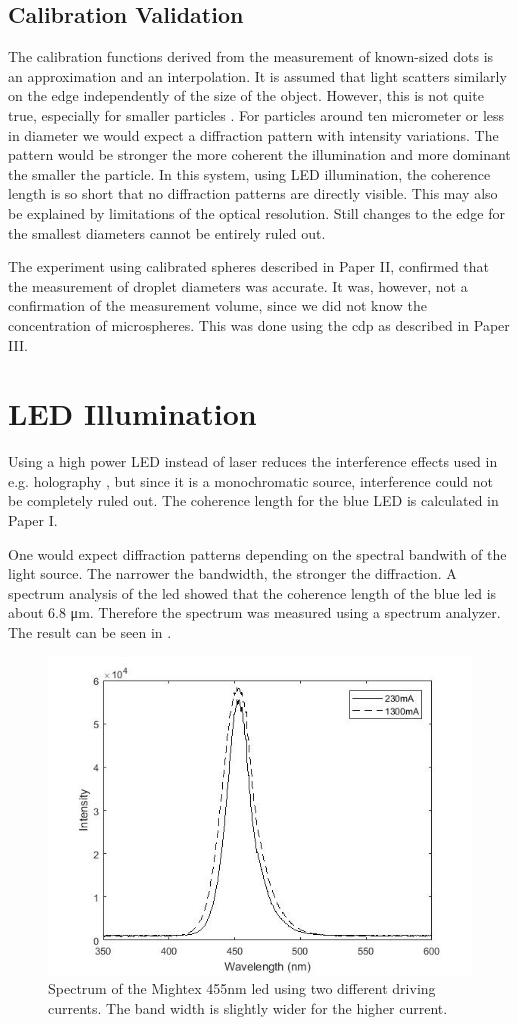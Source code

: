 \subsection{Calibration Validation}

The calibration functions derived from the measurement of known-sized dots is an approximation and an interpolation. It is assumed that light scatters similarly on the edge independently of the size of the object. However, this is not quite true, especially for smaller particles \cite{bohr2008}. For particles around ten micrometer or less in diameter we would expect a diffraction pattern with intensity variations. The pattern would be stronger the more coherent the illumination and more dominant the smaller the particle. In this system, using LED illumination, the coherence length is so short that no diffraction patterns are directly visible. This may also be explained by limitations of the optical resolution. Still changes to the edge for the smallest diameters cannot be entirely ruled out.

The experiment using calibrated spheres described in Paper II, confirmed that the measurement of droplet diameters was accurate. It was, however, not a confirmation of the measurement volume, since we did not know the concentration of microspheres. This was done using the \gls{cdp} as described in Paper III.

\section{LED Illumination}
\label{sec:ledillumination}
Using a high power LED instead of laser reduces the interference effects used in e.g. holography \cite{henn2013}, but since it is a monochromatic source, interference could not be completely ruled out. The coherence length for the blue LED is calculated in Paper I.

One would expect diffraction patterns depending on the spectral bandwith of the light source. The narrower the bandwidth, the stronger the diffraction. A spectrum analysis of the \gls{led} showed that the coherence length of the blue \gls{led} is about 6.8 μm. Therefore the spectrum was measured using a spectrum analyzer. The result can be seen in .

\begin{figure}%
\centering\includegraphics[width=0.6\linewidth]{figures/spektralanalys_mightex455nm}
\caption{Spectrum of the Mightex 455nm \gls{led} using two different driving currents. The band width is slightly wider for the higher current.}
\label{fig:ledspectrum}
\end{figure}

